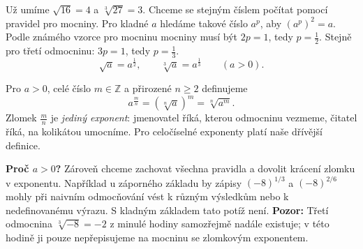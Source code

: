 \documentclass[11pt,a4paper]{article}
\begin{document}

Už umíme $\sqrt{16}=4$ a $\sqrt[3]{27}=3$. Chceme se stejným číslem
počítat pomocí pravidel pro mocniny. Pro kladné $a$ hledáme takové číslo
$a^p$, aby $(a^p)^2=a$. Podle známého vzorce pro mocninu mocniny
musí být $2p=1$, tedy $p=\tfrac12$. Stejně pro třetí odmocninu:
$3p=1$, tedy $p=\tfrac13$.
\[
\sqrt a=a^{\frac12},\qquad \sqrt[3]a=a^{\frac13}\qquad (a>0).
\]

\begin{definiceBox}[title={Definice - Mocnina s racionálním exponentem}]
Pro $a>0$, celé číslo $m\in\mathbb Z$ a přirozené $n\ge2$ definujeme
\[
\boxed{\displaystyle a^{\frac mn}=(\sqrt[n]{a})^m=\sqrt[n]{a^m}.}
\]
Zlomek $\frac mn$ je \emph{jediný exponent}: jmenovatel říká, kterou
odmocninu vezmeme, čitatel říká, na kolikátou umocníme.
Pro celočíselné exponenty platí naše dřívější definice.
\end{definiceBox}
\textbf{Proč $a>0$?} Zároveň chceme zachovat všechna pravidla a dovolit
krácení zlomku v exponentu. Například u záporného základu by zápisy
$(-8)^{1/3}$ a $(-8)^{2/6}$ mohly při naivním odmocňování vést k různým
výsledkům nebo k nedefinovanému výrazu. S kladným základem tato potíž není.
\textbf{Pozor:} Třetí odmocnina $\sqrt[3]{-8}=-2$ z minulé hodiny
samozřejmě nadále existuje; v této hodině ji pouze nepřepisujeme
na mocninu se zlomkovým exponentem.
\end{document}
